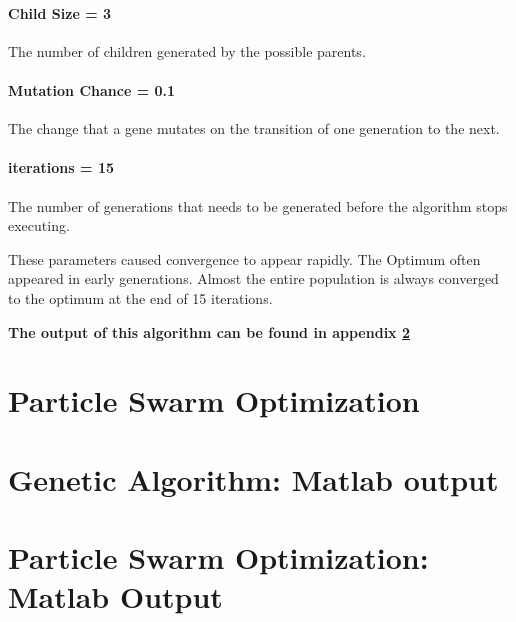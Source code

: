 \documentclass[10pt,a4paper]{article}
\begin{document}
\paragraph{Child Size = 3} The number of children generated by the possible parents.
\paragraph{Mutation Chance = 0.1} The change that a gene mutates on the transition of one generation to the next.
\paragraph{iterations = 15} The number of generations that needs to be generated before the algorithm stops executing.

\bigskip

\noindent These parameters caused convergence to appear rapidly. The Optimum often appeared in early generations. Almost the entire population is always converged to the optimum at the end of 15 iterations.

\medskip

\noindent \textbf{The output of this algorithm can be found in appendix \ref{sec:genMatlab}}
\section{Particle Swarm Optimization}
\appendix
\section{Genetic Algorithm: Matlab output}
\label{sec:genMatlab}

\section{Particle Swarm Optimization: Matlab Output}
\end{document}
